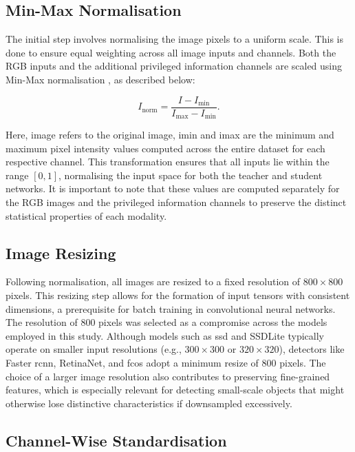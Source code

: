 \subsection{Min-Max Normalisation}
\label{subsec:4_normalisation}

The initial step involves normalising the image pixels to a uniform scale. This is done to ensure equal weighting across all image inputs and channels. Both the RGB inputs and the additional privileged information channels are scaled using Min-Max normalisation \cite{min_max_normalisation}, as described below:

\begin{equation} \label{eq:min_max}
I_{\text{norm}} = \frac{I - I_{\text{min}}}{I_{\text{max}} - I_{\text{min}}} .
\end{equation}

\noindent Here, \gls{image} refers to the original image, \gls{imin} and \gls{imax} are the minimum and maximum pixel intensity values computed across the entire dataset for each respective channel. This transformation ensures that all inputs lie within the range $[0, 1]$, normalising the input space for both the teacher and student networks. It is important to note that these values are computed separately for the RGB images and the privileged information channels to preserve the distinct statistical properties of each modality.

\subsection{Image Resizing}
\label{subsec:4_resizing}

Following normalisation, all images are resized to a fixed resolution of $800 \times 800$ pixels. This resizing step allows for the formation of input tensors with consistent dimensions, a prerequisite for batch training in convolutional neural networks. The resolution of $800$ pixels was selected as a compromise across the models employed in this study.
Although models such as \gls{ssd} and SSDLite typically operate on smaller input resolutions (e.g., $300 \times 300$ or $320 \times 320$), detectors like Faster \gls{rcnn}, RetinaNet, and \gls{fcos} adopt a minimum resize of $800$ pixels. The choice of a larger image resolution also contributes to preserving fine-grained features, which is especially relevant for detecting small-scale objects that might otherwise lose distinctive characteristics if downsampled excessively.

\subsection{Channel-Wise Standardisation}
\label{subsec:4_standardisation}

